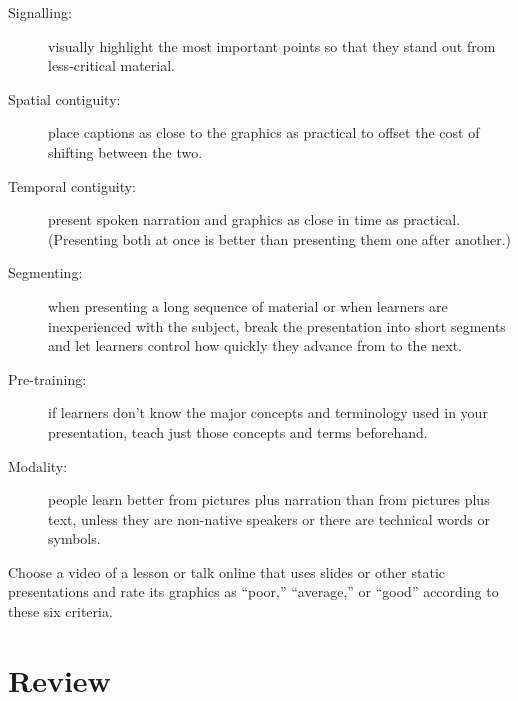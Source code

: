 \begin{description}

\item[Signalling:]
  visually highlight the most important points
  so that they stand out from less-critical material.

\item[Spatial contiguity:]
  place captions as close to the graphics as practical to offset the cost of shifting between the two.

\item[Temporal contiguity:]
  present spoken narration and graphics as close in time as practical.
  (Presenting both at once is better than presenting them one after another.)

\item[Segmenting:]
  when presenting a long sequence of material or when learners are inexperienced with the subject,
  break the presentation into short segments
  and let learners control how quickly they advance from to the next.

\item[Pre-training:]
  if learners don't know the major concepts and terminology used in your presentation,
  teach just those concepts and terms beforehand.

\item[Modality:]
  people learn better from pictures plus narration than from pictures plus text,
  unless they are non-native speakers
  or there are technical words or symbols.

\end{description}

Choose a video of a lesson or talk online that uses slides or other static presentations
and rate its graphics as ``poor,'' ``average,'' or ``good'' according to these six criteria.

\section*{Review}


